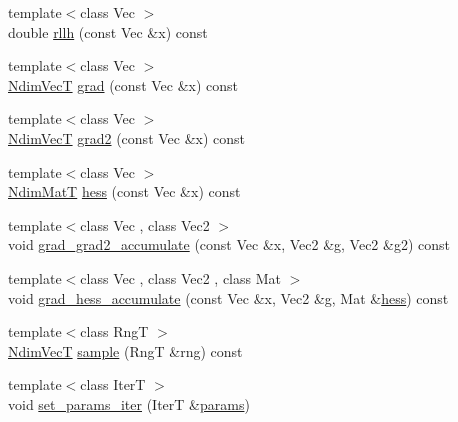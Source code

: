 \begin{DoxyCompactItemize}
\item 
{\footnotesize template$<$class Vec $>$ }\\double \hyperlink{classprior__hessian_1_1CopulaDistImpl_1_1CopulaDist_aef86eb508c0190d05e541c6e394c6392}{rllh} (const Vec \&x) const 
\item 
{\footnotesize template$<$class Vec $>$ }\\\hyperlink{classprior__hessian_1_1CopulaDistImpl_1_1CopulaDist_a94fa53fddcc81dcefec387f68294472d}{Ndim\+VecT} \hyperlink{classprior__hessian_1_1CopulaDistImpl_1_1CopulaDist_aa6fce557f6d86ff9df39f172919bf52d}{grad} (const Vec \&x) const 
\item 
{\footnotesize template$<$class Vec $>$ }\\\hyperlink{classprior__hessian_1_1CopulaDistImpl_1_1CopulaDist_a94fa53fddcc81dcefec387f68294472d}{Ndim\+VecT} \hyperlink{classprior__hessian_1_1CopulaDistImpl_1_1CopulaDist_ac4d5df1415cd5fa8b2e1abee571db37c}{grad2} (const Vec \&x) const 
\item 
{\footnotesize template$<$class Vec $>$ }\\\hyperlink{classprior__hessian_1_1CopulaDistImpl_1_1CopulaDist_a7f046aa9054ecf384b9f4ae157acfa49}{Ndim\+MatT} \hyperlink{classprior__hessian_1_1CopulaDistImpl_1_1CopulaDist_a9053b04a2b0dd8eab62e407307f77a86}{hess} (const Vec \&x) const 
\item 
{\footnotesize template$<$class Vec , class Vec2 $>$ }\\void \hyperlink{classprior__hessian_1_1CopulaDistImpl_1_1CopulaDist_a8d948333196942aad176ee4eee195de6}{grad\+\_\+grad2\+\_\+accumulate} (const Vec \&x, Vec2 \&g, Vec2 \&g2) const 
\item 
{\footnotesize template$<$class Vec , class Vec2 , class Mat $>$ }\\void \hyperlink{classprior__hessian_1_1CopulaDistImpl_1_1CopulaDist_a80d981a32437ea7ab542d4e2685fbbda}{grad\+\_\+hess\+\_\+accumulate} (const Vec \&x, Vec2 \&g, Mat \&\hyperlink{classprior__hessian_1_1CopulaDistImpl_1_1CopulaDist_a9053b04a2b0dd8eab62e407307f77a86}{hess}) const 
\item 
{\footnotesize template$<$class RngT $>$ }\\\hyperlink{classprior__hessian_1_1CopulaDistImpl_1_1CopulaDist_a94fa53fddcc81dcefec387f68294472d}{Ndim\+VecT} \hyperlink{classprior__hessian_1_1CopulaDistImpl_1_1CopulaDist_aa79a7674b1f33b2fb8ca4bba4e158221}{sample} (RngT \&rng) const 
\item 
{\footnotesize template$<$class IterT $>$ }\\void \hyperlink{classprior__hessian_1_1CopulaDistImpl_1_1CopulaDist_a3c76fabe7fefc83aa19454951c1513dd}{set\+\_\+params\+\_\+iter} (IterT \&\hyperlink{classprior__hessian_1_1CopulaDistImpl_1_1CopulaDist_a0ca7e24c5dba13279c613c95434b46a2}{params})
\end{DoxyCompactItemize}
